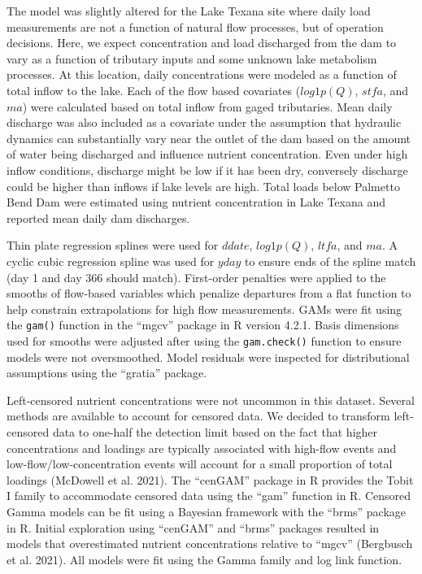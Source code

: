 \documentclass[
]{article}
\begin{document}
The model was slightly altered for the Lake Texana site where daily load
measurements are not a function of natural flow processes, but of
operation decisions. Here, we expect concentration and load discharged
from the dam to vary as a function of tributary inputs and some unknown
lake metabolism processes. At this location, daily concentrations were
modeled as a function of total inflow to the lake. Each of the flow
based covariates (\(log1p(Q)\), \(stfa\), and \(ma\)) were calculated
based on total inflow from gaged tributaries. Mean daily discharge was
also included as a covariate under the assumption that hydraulic
dynamics can substantially vary near the outlet of the dam based on the
amount of water being discharged and influence nutrient concentration.
Even under high inflow conditions, discharge might be low if it has been
dry, conversely discharge could be higher than inflows if lake levels
are high. Total loads below Palmetto Bend Dam were estimated using
nutrient concentration in Lake Texana and reported mean daily dam
discharges.

Thin plate regression splines were used for \(ddate\), \(log1p(Q)\),
\(ltfa\), and \(ma\). A cyclic cubic regression spline was used for
\(yday\) to ensure ends of the spline match (day 1 and day 366 should
match). First-order penalties were applied to the smooths of flow-based
variables which penalize departures from a flat function to help
constrain extrapolations for high flow measurements. GAMs were fit using
the \texttt{gam()} function in the ``mgcv'' package in R version 4.2.1.
Basis dimensions used for smooths were adjusted after using the
\texttt{gam.check()} function to ensure models were not oversmoothed.
Model residuals were inspected for distributional assumptions using the
``gratia'' package.

Left-censored nutrient concentrations were not uncommon in this dataset.
Several methods are available to account for censored data. We decided
to transform left-censored data to one-half the detection limit based on
the fact that higher concentrations and loadings are typically
associated with high-flow events and low-flow/low-concentration events
will account for a small proportion of total loadings (McDowell et al.
2021). The ``cenGAM'' package in R provides the Tobit I family to
accommodate censored data using the ``gam'' function in R. Censored
Gamma models can be fit using a Bayesian framework with the ``brms''
package in R. Initial exploration using ``cenGAM'' and ``brms'' packages
resulted in models that overestimated nutrient concentrations relative
to ``mgcv'' (Bergbusch et al. 2021). All models were fit using the Gamma
family and log link function.
\end{document}

